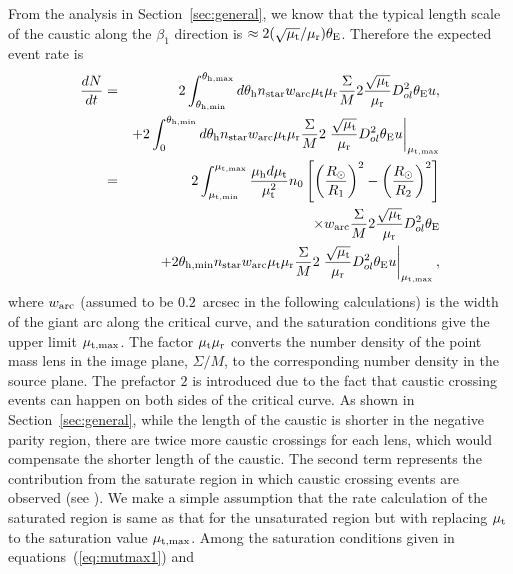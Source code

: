 \documentclass[showpacs,twocolumn,preprintnumbers,amsmath,amssymb,superscriptaddress,nofootinbib]{revtex4}
\begin{document}
From the analysis in Section~\ref{sec:general}, we know that the
typical length scale of the caustic along the $\beta_1$ direction is
$\approx 2(\sqrt{\mu_{\rm t}}/\mu_{\rm r})\theta_{\rm E}$. Therefore
the expected event rate is 
\begin{eqnarray}
\frac{dN}{dt}&=&2\int_{\theta_{\rm h,min}}^{\theta_{\rm h,max}}
d\theta_{\rm h} n_{\rm star}w_{\rm arc}\mu_{\rm t}\mu_{\rm r}
\frac{\Sigma}{M}2\frac{\sqrt{\mu_{\rm t}}}{\mu_{\rm
    r}}D_{ol}^2\theta_{\rm E}u,\nonumber\\
&&+2\int_0^{\theta_{\rm h,min}}d\theta_{\rm h}n_{\rm star}w_{\rm arc}\mu_{\rm t}\mu_{\rm r}
\frac{\Sigma}{M}2\left.\frac{\sqrt{\mu_{\rm t}}}{\mu_{\rm
    r}}D_{ol}^2\theta_{\rm E}u\right|_{\mu_{\rm t,max}}\nonumber\\
&=&2\int_{\mu_{\rm t,min}}^{\mu_{\rm t,max}} \frac{\mu_{\rm h}d\mu_{\rm t}}{\mu_{\rm
    t}^2}n_0\left[\left(\frac{R_\odot}{R_1}\right)^2-\left(\frac{R_\odot}{R_2}\right)^2\right]
\nonumber\\
&&\times w_{\rm arc}\frac{\Sigma}{M}2\frac{\sqrt{\mu_{\rm t}}}{\mu_{\rm r}}
D_{ol}^2 \theta_{\rm E}\nonumber\\
&&+2\theta_{\rm h,min}n_{\rm star}w_{\rm arc}\mu_{\rm t}\mu_{\rm r}
\frac{\Sigma}{M}2\left.\frac{\sqrt{\mu_{\rm t}}}{\mu_{\rm
    r}}D_{ol}^2\theta_{\rm E}u\right|_{\mu_{\rm t,max}},
\label{eq:dndt_full}
\end{eqnarray}
where $w_{\rm arc}$ (assumed to be $0.2$~arcsec in the following
calculations) is the width of the giant arc along the critical curve,
and the saturation conditions give the upper limit $\mu_{\rm t,
  max}$. The factor $\mu_{\rm t}\mu_{\rm r}$ converts the number
density of the point mass lens in the image plane, $\Sigma/M$, to the
corresponding number density in the source plane. The prefactor $2$ is
introduced due to the fact that caustic crossing events can happen on
both sides of the critical curve. As shown in
Section~\ref{sec:general}, while the length of the caustic is shorter
in the negative parity region, there are twice more caustic crossings
for each lens, which would compensate the shorter length of the caustic.
The second term represents the contribution from the saturate region
in which caustic crossing events 
are observed (see \cite{Diego:2017drh,Venumadhav:2017pps}). We make a
simple assumption that the rate calculation of the saturated region is
same as that for the unsaturated region but with replacing $\mu_{\rm
  t}$ to the saturation value $\mu_{\rm t, max}$. Among the saturation
conditions given in  equations~(\ref{eq:mutmax1}) and
\end{document}
